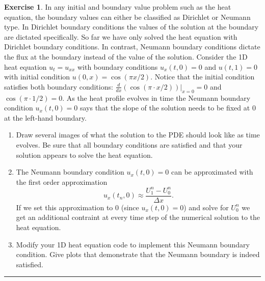 \documentclass[
]{book}
\providecommand{\tightlist}{%
  \setlength{\itemsep}{0pt}\setlength{\parskip}{0pt}}
\theoremstyle{definition}
\theoremstyle{definition}
\theoremstyle{definition}
\newtheorem{exercise}{Exercise}[chapter]
\theoremstyle{remark}
\begin{document}
\begin{exercise}
\protect\hypertarget{exr:unnamed-chunk-554}{}{\label{exr:unnamed-chunk-554} }In any initial and boundary value problem such as the heat equation, the boundary values can either be classified as Dirichlet or Neumann type. In Dirichlet boundary conditions the values of the solution at the boundary are dictated specifically. So far we have only solved the heat equation with Dirichlet boundary conditions. In contrast, Neumann boundary conditions dictate the flux at the boundary instead of the value of the solution. Consider the 1D heat equation \(u_t = u_{xx}\) with boundary conditions \(u_x(t,0)=0\) and \(u(t,1)=0\) with initial condition \(u(0,x) = \cos(\pi x/2)\). Notice that the initial condition satisfies both boundary conditions: \(\frac{d}{dx}(\cos(\pi \cdot x/2))\Big|_{x=0} = 0\) and \(\cos(\pi \cdot 1/2)=0\). As the heat profile evolves in time the Neumann boundary condition \(u_x(t,0)=0\) says that the slope of the solution needs to be fixed at 0 at the left-hand boundary.

\begin{enumerate}
\def\labelenumi{\alph{enumi}.}
\tightlist
\item
  Draw several images of what the solution to the PDE should look like as time evolves. Be sure that all boundary conditions are satisfied and that your solution appears to solve the heat equation.
\item
  The Neumann boundary condition \(u_x(t,0) = 0\) can be approximated with the first order approximation
  \[ u_x(t_n,0) \approx \frac{U_1^n - U_0^n}{\Delta x}. \]
  If we set this approximation to 0 (since \(u_x(t,0)=0\)) and solve for \(U_0^n\) we get an additional contraint at every time step of the numerical solution to the heat equation.
\item
  Modify your 1D heat equation code to implement this Neumann boundary condition. Give plots that demonstrate that the Neumann boundary is indeed satisfied.
\end{enumerate}
\end{exercise}

\begin{center}\rule{0.5\linewidth}{0.5pt}\end{center}
\end{document}
